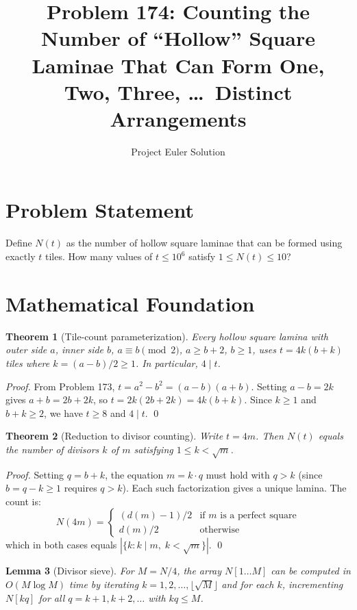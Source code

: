 \documentclass[11pt]{article}
\title{Problem 174: Counting the Number of ``Hollow'' Square Laminae That Can Form One, Two, Three, \ldots\ Distinct Arrangements}
\author{Project Euler Solution}
\date{}
\newtheorem{theorem}{Theorem}
\newtheorem{lemma}[theorem]{Lemma}
\begin{document}
\maketitle

\section{Problem Statement}

Define $N(t)$ as the number of hollow square laminae that can be formed using exactly $t$ tiles. How many values of $t \leq 10^6$ satisfy $1 \leq N(t) \leq 10$?

\section{Mathematical Foundation}

\begin{theorem}[Tile-count parameterization]
Every hollow square lamina with outer side $a$, inner side $b$, $a \equiv b \pmod{2}$, $a \geq b + 2$, $b \geq 1$, uses $t = 4k(b + k)$ tiles where $k = (a - b)/2 \geq 1$. In particular, $4 \mid t$.
\end{theorem}

\begin{proof}
From Problem 173, $t = a^2 - b^2 = (a - b)(a + b)$. Setting $a - b = 2k$ gives $a + b = 2b + 2k$, so $t = 2k(2b + 2k) = 4k(b + k)$. Since $k \geq 1$ and $b + k \geq 2$, we have $t \geq 8$ and $4 \mid t$. \qed
\end{proof}

\begin{theorem}[Reduction to divisor counting]
Write $t = 4m$. Then $N(t)$ equals the number of divisors $k$ of $m$ satisfying $1 \leq k < \sqrt{m}$.
\end{theorem}

\begin{proof}
Setting $q = b + k$, the equation $m = k \cdot q$ must hold with $q > k$ (since $b = q - k \geq 1$ requires $q > k$). Each such factorization gives a unique lamina. The count is:
\[
N(4m) = \begin{cases} (d(m) - 1)/2 & \text{if } m \text{ is a perfect square} \\ d(m)/2 & \text{otherwise} \end{cases}
\]
which in both cases equals $|\{k : k \mid m,\; k < \sqrt{m}\}|$. \qed
\end{proof}

\begin{lemma}[Divisor sieve]
For $M = N/4$, the array $N[1 \ldots M]$ can be computed in $O(M \log M)$ time by iterating $k = 1, 2, \ldots, \lfloor\sqrt{M}\rfloor$ and for each $k$, incrementing $N[kq]$ for all $q = k + 1, k + 2, \ldots$ with $kq \leq M$.
\end{lemma}
\end{document}
